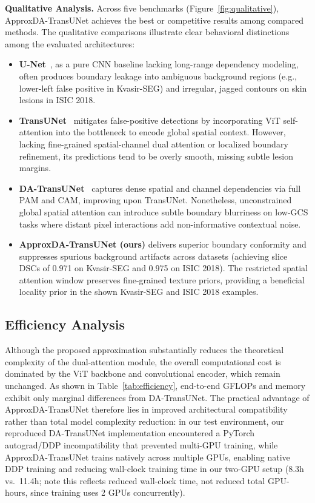 \textbf{Qualitative Analysis.} Across five benchmarks (Figure~\ref{fig:qualitative}), ApproxDA-TransUNet achieves the best or competitive results among compared methods. The qualitative comparisons illustrate clear behavioral distinctions among the evaluated architectures:
\begin{itemize}
  \item \textbf{U-Net}~\cite{ronneberger2015unet}, as a pure CNN baseline lacking long-range dependency modeling, often produces boundary leakage into ambiguous background regions (e.g., lower-left false positive in Kvasir-SEG) and irregular, jagged contours on skin lesions in ISIC 2018.
  \item \textbf{TransUNet}~\cite{chen2021transunet} mitigates false-positive detections by incorporating ViT self-attention into the bottleneck to encode global spatial context. However, lacking fine-grained spatial-channel dual attention or localized boundary refinement, its predictions tend to be overly smooth, missing subtle lesion margins.
  \item \textbf{DA-TransUNet}~\cite{sun2024datransunet} captures dense spatial and channel dependencies via full PAM and CAM, improving upon TransUNet. Nonetheless, unconstrained global spatial attention can introduce subtle boundary blurriness on low-GCS tasks where distant pixel interactions add non-informative contextual noise.
  \item \textbf{ApproxDA-TransUNet (ours)} delivers superior boundary conformity and suppresses spurious background artifacts across datasets (achieving slice DSCs of 0.971 on Kvasir-SEG and 0.975 on ISIC 2018). The restricted spatial attention window preserves fine-grained texture priors, providing a beneficial locality prior in the shown Kvasir-SEG and ISIC 2018 examples.
\end{itemize}


\subsection{Efficiency Analysis}

Although the proposed approximation substantially reduces the theoretical complexity of the dual-attention module, the overall computational cost is dominated by the ViT backbone and convolutional encoder, which remain unchanged. As shown in Table~\ref{tab:efficiency}, end-to-end GFLOPs and memory exhibit only marginal differences from DA-TransUNet. The practical advantage of ApproxDA-TransUNet therefore lies in improved architectural compatibility rather than total model complexity reduction: in our test environment, our reproduced DA-TransUNet implementation encountered a PyTorch autograd/DDP incompatibility that prevented multi-GPU training, while ApproxDA-TransUNet trains natively across multiple GPUs, enabling native DDP training and reducing wall-clock training time in our two-GPU setup (8.3h vs.\ 11.4h; note this reflects reduced wall-clock time, not reduced total GPU-hours, since training uses 2 GPUs concurrently).

